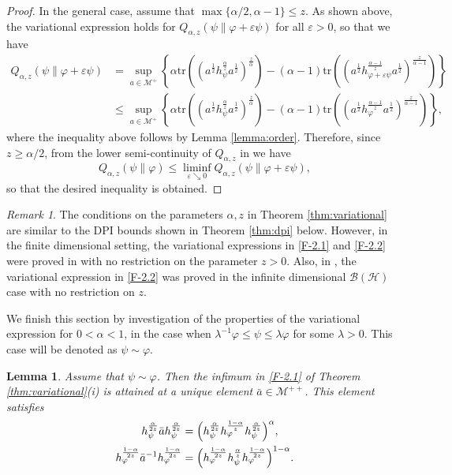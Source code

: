 \documentclass[12pt]{article}
\newtheorem{lemma}[theorem]{Lemma}
\theoremstyle{definition}
\theoremstyle{remark}
\newtheorem{remark}[theorem]{Remark}
\numberwithin{equation}{section}
\def\Me{\mathcal M}
\def\Tr{\mathrm{tr}}
\def\ffi{\varphi}
\begin{document}
\begin{proof}
In the general case, assume that $\max\{\alpha/2,\alpha-1\}\le z$. As shown above,
the variational expression holds for $Q_{\alpha,z}(\psi\|\varphi+\varepsilon\psi)$ for all
$\varepsilon>0$, so that we have
\begin{align*}
Q_{\alpha,z}(\psi\|\varphi+\varepsilon\psi)&=\sup_{a\in \Me^+} \left\{\alpha
\Tr\left((a^{\frac12}h_\psi^{\frac{\alpha}{z}}a^{\frac12})^{\frac{z}{\alpha}}\right)
-(\alpha-1)\Tr\left((a^{\frac12}h_{\varphi+\varepsilon \psi}^{\frac{\alpha-1}{z}}
a^{\frac12})^{\frac{z}{\alpha-1}}\right)\right\}\\
&\le\sup_{a\in \Me^+} \left\{\alpha
\Tr\left((a^{\frac12}h_\psi^{\frac{\alpha}{z}}a^{\frac12})^{\frac{z}{\alpha}}\right)-(\alpha-1)
\Tr\left((a^{\frac12}h_\varphi^{\frac{\alpha-1}{z}}a^{\frac12})^{\frac{z}{\alpha-1}}\right)
\right\},
\end{align*}
where the inequality above follows by Lemma \ref{lemma:order}. Therefore,
since $z\ge\alpha/2$, from the lower semi-continuity of $Q_{\alpha,z}$ in
\cite[Theorem 2(iv)]{kato2023onrenyi} we have
\[
Q_{\alpha,z}(\psi\|\varphi)\le \liminf_{\varepsilon\searrow 0}
Q_{\alpha,z}(\psi\|\varphi+\varepsilon \psi),
\]
so that the desired inequality is obtained.
\end{proof}

\begin{remark}\label{remark:variational}
The conditions on the parameters $\alpha,z$ in Theorem \ref{thm:variational} are similar to the DPI
bounds shown in Theorem \ref{thm:dpi} below. However, in the finite dimensional setting, the variational
expressions in \eqref{F-2.1} and \eqref{F-2.2} were proved in \cite[Theorem 3.3]{zhang2020fromwyd}
with no restriction on the parameter $z>0$. Also, in \cite[Lemma 3.23]{mosonyi2023thestrong}, the
variational expression in \eqref{F-2.2} was proved in the infinite dimensional $\mathcal{B}(\mathcal{H})$
case with no restriction on $z$.
\end{remark}

\medskip
We finish this section by investigation of the properties of the variational expression for
$0<\alpha<1$, in the case when $\lambda^{-1}\ffi\le \psi\le \lambda \ffi$ for some
$\lambda>0$. This case will be denoted as $\psi\sim \ffi$. 

\begin{lemma}\label{lemma:variational_majorized}
Assume that $\psi\sim\ffi$. Then the infimum in \eqref{F-2.1} of Theorem \ref{thm:variational}(i) is
attained at a unique element $\bar a\in \Me^{++}$. This element satisfies
\begin{align}
h_\psi^{\alpha\over2z}\bar ah_\psi^{\alpha\over2z}
&=\Bigl(h_\psi^{\alpha\over2z}h_\ffi^{1-\alpha\over z}h_\psi^{\alpha\over2z}\Bigr)^\alpha,
\label{eq:minimizer1}\\
h_\ffi^{1-\alpha\over2z}\bar a^{-1}h_\ffi^{1-\alpha\over2z}
&=\Bigl(h_\ffi^{1-\alpha\over2z}h_\psi^{\alpha\over
z}h_\ffi^{1-\alpha\over2z}\Bigr)^{1-\alpha}.
\label{eq:minimizer2}
\end{align}
\end{lemma}
\end{document}
